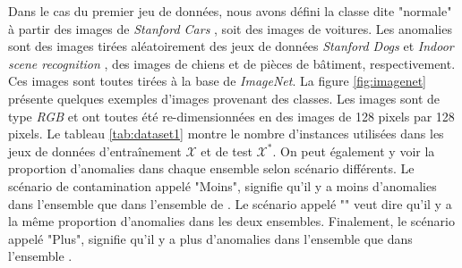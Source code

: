 Dans le cas du premier jeu de données, nous avons défini la classe dite "normale" à partir des images de \textit{Stanford Cars} \citep{KrauseStarkDengFei-Fei_3DRR2013}, soit des images de voitures. Les anomalies sont des images tirées aléatoirement des jeux de données \textit{Stanford Dogs} \citep{KhoslaYaoJayadevaprakashFeiFei_FGVC2011} et \textit{Indoor scene recognition} \citep{5206537}, des images de chiens et de pièces de bâtiment, respectivement. Ces images sont toutes tirées à la base de \textit{ImageNet}. La figure \ref{fig:imagenet} présente quelques exemples d'images provenant des \DIFdelbegin {}\DIFdelend \DIFaddbegin {}\DIFaddend classes. Les images sont de type \textit{RGB} et ont toutes été re-dimensionnées en des images de 128 pixels par 128 pixels. Le tableau \ref{tab:dataset1} montre le nombre d'instances utilisées dans les jeux de données d'entraînement $\mathcal{X}$ et de test $\mathcal{X^*}$. On peut également y voir la proportion d'anomalies dans chaque ensemble selon \DIFdelbegin {}\DIFdelend \DIFaddbegin {}\DIFaddend scénario différents. Le scénario de contamination appelé "Moins", signifie qu'il y a moins d'anomalies dans l'ensemble \DIFdelbegin {}\DIFdelend \DIFaddbegin {}\DIFaddend que dans l'ensemble de \DIFdelbegin {}\DIFdelend \DIFaddbegin {}\DIFaddend . Le scénario appelé "\DIFdelbegin {}\DIFdelend \DIFaddbegin {}\DIFaddend " veut dire qu'il y a la même proportion d'anomalies dans les deux ensembles. Finalement, le scénario appelé "Plus", signifie qu'il y a plus d'anomalies dans l'ensemble \DIFdelbegin {}\DIFdelend \DIFaddbegin {}\DIFaddend que dans l'ensemble \DIFdelbegin {}\DIFdelend \DIFaddbegin {}\DIFaddend .

